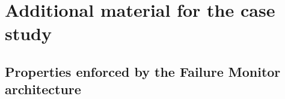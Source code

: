 \documentclass{llncs}
\begin{document}


\section{Additional material for the case study}

\subsection{Properties enforced by the Failure Monitor architecture}
\label{secn:properties}
\end{document}
